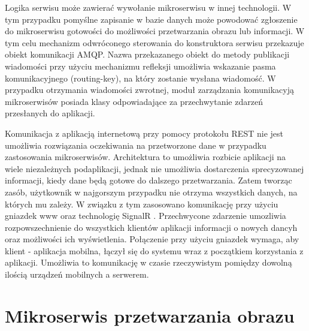 {Logika serwisu może zawierać wywołanie mikroserwisu w innej technologii. W tym przypadku pomyślne zapisanie w bazie danych może powodować zgłoszenie do mikroserwisu gotowości do możliwości przetwarzania obrazu lub informacji. W tym celu mechanizm odwróconego sterowania do konstruktora serwisu przekazuje obiekt komunikacji AMQP. Nazwa przekazanego obiekt do metody publikacji wiadomości przy użyciu mechanizmu refleksji umożliwia wskazanie pasma komunikacyjnego (routing-key), na który zostanie wysłana wiadomość. W przypadku otrzymania wiadomości zwrotnej, moduł zarządzania komunikacyją mikroserwisów posiada klasy odpowiadające za przechwytanie zdarzeń przesłanych do aplikacji. 

Komunikacja z aplikacją internetową przy pomocy protokołu REST nie jest umożliwia rozwiązania oczekiwania na przetworzone dane w przypadku zastosowania mikroserwisów. Architektura to umożliwia rozbicie aplikacji na wiele niezależnych podaplikacji, jednak nie umożliwia dostarczenia sprecyzowanej informacji, kiedy dane będą gotowe do dalszego przetwarzania. Zatem tworząc zasób, użytkownik w najgorszym przypadku nie otrzyma wszystkich danych, na których mu zależy. W związku z tym zasosowano komunikację przy użyciu gniazdek www oraz technologię SignalR \cite{SignalR}. Przechwycone zdarzenie umozliwia rozpowszechnienie do wszystkich klientów aplikacji informacji o nowych dancyh oraz możliwości ich wyświetlenia. Połączenie przy użyciu gniazdek wymaga, aby klient - aplikacja mobilna, łączył się do systemu wraz z początkiem korzystania z aplikacji. Umożliwia to komunikację w czasie rzeczywistym pomiędzy dowolną ilością urządzeń mobilnych a serwerem.
}

\section{Mikroserwis przetwarzania obrazu}

{ }
\\
\begin{center}

\end{center}
